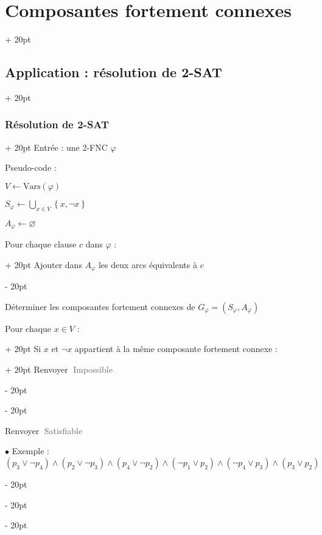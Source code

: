\documentclass[a4paper, 12pt, twoside]{article}
\newcommand{\set}[1]{\left\{ #1 \right\}}
\newcommand{\simplecit}[1]{\guillemotleft$\;$#1$\;$\guillemotright}
\newcommand{\cit}[1]{\simplecit{\textcolor{656565}{#1}}}
\newcommand{\ind}[1][20pt]{\advance\leftskip + #1}
\newcommand{\deind}[1][20pt]{\advance\leftskip - #1}
\newenvironment{indt}[2][20pt]{#2 \par \ind[#1]}{\par \deind} %
\begin{document}
\begin{indt}{\section{Composantes fortement connexes}}
\begin{indt}{\subsection{Application : résolution de 2-SAT}}
\begin{indt}{\subsubsection{Résolution de 2-SAT}}
                Entrée : une 2-FNC $\varphi$

                Pseudo-code :
                \begin{pseudocode}
                    $V \leftarrow \mathrm{Vars}(\varphi)$

                    $S_\varphi \leftarrow \bigcup_{x \in V} \set{x, \neg x}$

                    $A_\varphi \leftarrow \varnothing$

                    \vspace{6pt}
                    
                    \begin{indt}{Pour chaque clause $c$ dans $\varphi$ :}
                        Ajouter dans $A_\varphi$ les deux arcs équivalents à $c$
                    \end{indt}

                    \vspace{6pt}
                    
                    Déterminer les composantes fortement connexes de $G_\varphi = (S_\varphi, A_\varphi)$

                    \vspace{6pt}
                    
                    \begin{indt}{Pour chaque $x \in V$ :}
                        \begin{indt}{Si $x$ et $\neg x$ appartient à la même composante fortement connexe :}
                            Renvoyer \cit{Impossible}
                        \end{indt}
                    \end{indt}

                    \vspace{6pt}
                    
                    Renvoyer \cit{Satisfiable}
                \end{pseudocode}

                \vspace{12pt}
                
                $\bullet$ Exemple :
                \[
                    (p_3 \vee \neg p_4) \wedge (p_2 \vee \neg p_3) \wedge (p_4 \vee \neg p_2) \wedge (\neg p_1 \vee p_2) \wedge (\neg p_4 \vee p_3) \wedge (p_3 \vee p_2)
                \]

                \begin{center}
\end{center}
\end{indt}
\end{indt}
\end{indt}
\end{document}
